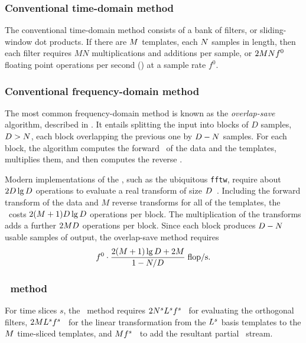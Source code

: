 \subsubsection{Conventional time-domain method}

The conventional time-domain method consists of a bank of \fir{} filters, or sliding-window dot products.  If there are $M$ templates, each $N$ samples in length, then each filter requires $M N$ multiplications and additions per sample, or $2 M N f^0$ floating point operations per second (\flops) at a sample rate $f^0$.

\subsubsection{Conventional frequency-domain method}

The most common frequency-domain method is known as the \emph{overlap-save} algorithm, described in \cite{numerical-recipes-chapter-13}.  It entails splitting the input into blocks of $D$ samples, $D > N$, each block overlapping the previous one by $D - N$ samples.  For each block, the algorithm computes the forward \fft\ of the data and the templates, multiplies them, and then computes the reverse \fft.

Modern implementations of the \fft, such as the ubiquitous \texttt{fftw}, require about $2 D \lg D$ operations to evaluate a real transform of size $D$~\cite{Johnson:2007p9654}.  Including the forward transform of the data and $M$ reverse transforms for all of the templates, the \fft\ costs $2 (M + 1) D \lg D$ operations per block.  The multiplication of the transforms adds a further $2 M D$ operations per block.  Since each block produces $D - N$ usable samples of output, the overlap-save method requires
$$
f^0 \cdot \frac{2 (M + 1) \lg D + 2 M}{1 - N/D} \; \mathrm{flop/s}.
$$

\subsubsection{\lloid\ method}

For time slices $s$, the \lloid\ method requires $2 N^s L^s f^s$ \flops\ 
for evaluating the orthogonal filters, $2 M L^s f^s$ \flops\ for the 
linear transformation from the $L^s$ basis templates to the $M$ time-sliced templates, and $M f^s$ \flops\ to add the resultant partial \SNR\ stream.

